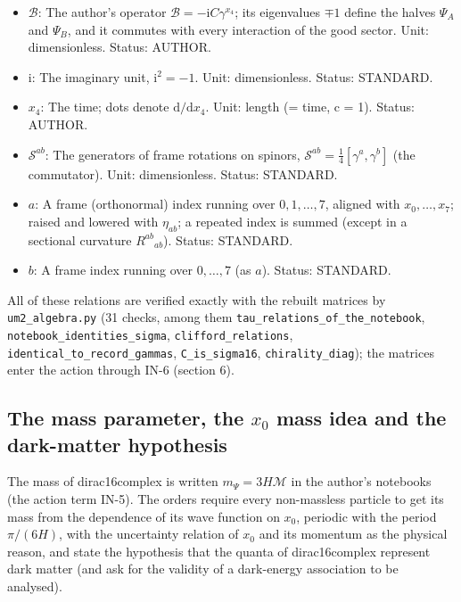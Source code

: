 \documentclass[
  10pt,
]{article}
\begin{document}
\begin{itemize}
  16 x 16 on spinors, 3 x 3 on the generations or flavours, 2 x 2 for
  the sigma field). Unit: dimensionless. Status: STANDARD.
\item
  \(\mathcal{B}\): The author's operator
  \(\mathcal{B} = -\mathrm{i}C\gamma^{x_4}\); its eigenvalues \(\mp1\)
  define the halves \(\Psi_A\) and \(\Psi_B\), and it commutes with
  every interaction of the good sector. Unit: dimensionless. Status:
  AUTHOR.
\item
  \(\mathrm{i}\): The imaginary unit, \(\mathrm{i}^2 = -1\). Unit:
  dimensionless. Status: STANDARD.
\item
  \(x_4\): The time; dots denote \(\mathrm{d}/\mathrm{d}x_4\). Unit:
  length (= time, c = 1). Status: AUTHOR.
\item
  \(\mathcal{S}^{ab}\): The generators of frame rotations on spinors,
  \(\mathcal{S}^{ab} = \frac14[\gamma^a, \gamma^b]\) (the commutator).
  Unit: dimensionless. Status: STANDARD.
\item
  \(a\): A frame (orthonormal) index running over \(0, 1, \dots, 7\),
  aligned with \(x_0, \dots, x_7\); raised and lowered with
  \(\eta_{ab}\); a repeated index is summed (except in a sectional
  curvature \(R^{ab}{}_{ab}\)). Status: STANDARD.
\item
  \(b\): A frame index running over \(0, \dots, 7\) (as \(a\)). Status:
  STANDARD.
\end{itemize}

All of these relations are verified exactly with the rebuilt matrices by
\texttt{um2\_algebra.py} (31 checks, among them
\texttt{tau\_relations\_of\_the\_notebook},
\texttt{notebook\_identities\_sigma}, \texttt{clifford\_relations},
\texttt{identical\_to\_record\_gammas}, \texttt{C\_is\_sigma16},
\texttt{chirality\_diag}); the matrices enter the action through IN-6
(section 6).

\hypertarget{the-mass-parameter-the-x_0-mass-idea-and-the-dark-matter-hypothesis}{%
\subsection{\texorpdfstring{The mass parameter, the \(x_0\) mass idea
and the dark-matter
hypothesis}{The mass parameter, the x\_0 mass idea and the dark-matter hypothesis}}\label{the-mass-parameter-the-x_0-mass-idea-and-the-dark-matter-hypothesis}}

The mass of dirac16complex is written \(m_\Psi = 3H\mathcal{M}\) in the
author's notebooks (the action term IN-5). The orders require every
non-massless particle to get its mass from the dependence of its wave
function on \(x_0\), periodic with the period \(\pi/(6H)\), with the
uncertainty relation of \(x_0\) and its momentum as the physical reason,
and state the hypothesis that the quanta of dirac16complex represent
dark matter (and ask for the validity of a dark-energy association to be
analysed).
\end{document}

